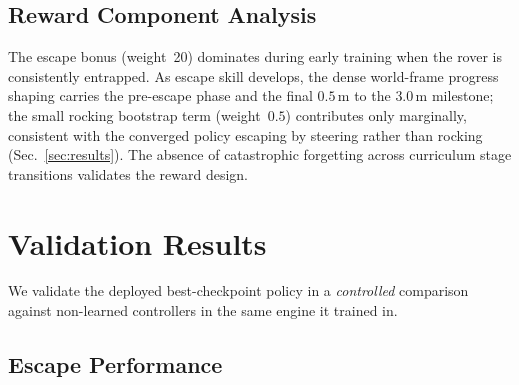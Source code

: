 \documentclass[conference]{IEEEtran}
\begin{document}
\subsection{Reward Component Analysis}

The escape bonus (weight~20) dominates during early training when the rover is
consistently entrapped. As escape skill develops, the dense world-frame progress
shaping carries the pre-escape phase and the final $0.5$\,m to the $3.0$\,m
milestone; the small rocking bootstrap term (weight~$0.5$) contributes only
marginally, consistent with the converged policy escaping by steering rather than
rocking (Sec.~\ref{sec:results}). The absence of catastrophic forgetting across
curriculum stage transitions validates the reward design.

\section{Validation Results}
\label{sec:validation}

We validate the deployed best-checkpoint policy in a \emph{controlled} comparison against non-learned controllers in the same engine it trained in.

\subsection{Escape Performance}
\end{document}
